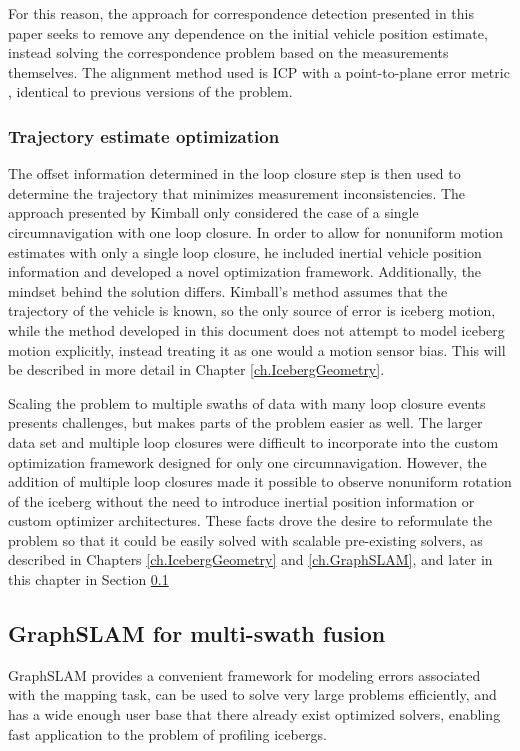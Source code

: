 For this reason, the approach for correspondence detection presented in this paper seeks to remove any dependence on the initial vehicle position estimate, instead solving the correspondence problem based on the measurements themselves. The alignment method used is ICP with a point-to-plane error metric \cite{?}, identical to previous versions of the problem. 

\subsubsection{Trajectory estimate optimization}

The offset information determined in the loop closure step is then used to determine the trajectory that minimizes measurement inconsistencies. The approach presented by Kimball only considered the case of a single circumnavigation with one loop closure. In order to allow for nonuniform motion estimates with only a single loop closure, he included inertial vehicle position information and developed a novel optimization framework. Additionally, the mindset behind the solution differs. Kimball's method assumes that the trajectory of the vehicle is known, so the only source of error is iceberg motion, while the method developed in this document does not attempt to model iceberg motion explicitly, instead treating it as one would a motion sensor bias. This will be described in more detail in Chapter \ref{ch.IcebergGeometry}.

Scaling the problem to multiple swaths of data with many loop closure events presents challenges, but makes parts of the problem easier as well. The larger data set and multiple loop closures were difficult to incorporate into the custom optimization framework designed for only one circumnavigation. However, the addition of multiple loop closures made it possible to observe nonuniform rotation of the iceberg without the need to introduce inertial position information or custom optimizer architectures. These facts drove the desire to reformulate the problem so that it could be easily solved with scalable pre-existing solvers, as described in Chapters \ref{ch.IcebergGeometry} and \ref{ch.GraphSLAM}, and later in this chapter in Section \ref{sec.GraphSLAMmotivation}

\subsection{GraphSLAM for multi-swath fusion}
\label{sec.GraphSLAMmotivation}
GraphSLAM provides a convenient framework for modeling errors associated with the mapping task, can be used to solve very large problems efficiently, and has a wide enough user base that there already exist optimized solvers, enabling fast application to the problem of profiling icebergs.

